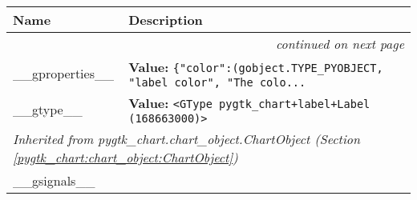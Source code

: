     \vspace{-1cm}
\hspace{\varindent}\begin{longtable}{|p{\varnamewidth}|p{\vardescrwidth}|l}
\cline{1-2}
\cline{1-2} \centering \textbf{Name} & \centering \textbf{Description}& \\
\cline{1-2}
\endhead\cline{1-2}\multicolumn{3}{r}{\small\textit{continued on next page}}\\\endfoot\cline{1-2}
\endlastfoot\raggedright \_\-\_\-g\-p\-r\-o\-p\-e\-r\-t\-i\-e\-s\-\_\-\_\- & \raggedright \textbf{Value:} 
{\tt \{"color":(gobject.TYPE\_PYOBJECT, "label color", "The colo\texttt{...}}&\\
\cline{1-2}
\raggedright \_\-\_\-g\-t\-y\-p\-e\-\_\-\_\- & \raggedright \textbf{Value:} 
{\tt {\textless}GType pygtk\_chart+label+Label (168663000){\textgreater}}&\\
\cline{1-2}
\multicolumn{2}{|l|}{\textit{Inherited from pygtk\_chart.chart\_object.ChartObject \textit{(Section \ref{pygtk_chart:chart_object:ChartObject})}}}\\
\multicolumn{2}{|p{\varwidth}|}{\raggedright \_\_gsignals\_\_}\\
\cline{1-2}
\end{longtable}

